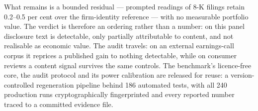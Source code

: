 What remains is a bounded residual --- prompted readings of 8-K filings retain 0.2--0.5 per cent over the firm-identity reference --- with no measurable portfolio value. %
The verdict is therefore an ordering rather than a number: on this panel disclosure text is detectable, only partially attributable to content, and not realisable as economic value.
The audit travels: on an external earnings-call corpus it reprices a published gain to nothing detectable, while on consumer reviews a content signal survives the same controls. %
The benchmark's licence-free core, the audit protocol and its power calibration are released for reuse: a version-controlled regeneration pipeline behind 186 automated tests, with all 240 production runs cryptographically fingerprinted and every reported number traced to a committed evidence file.

